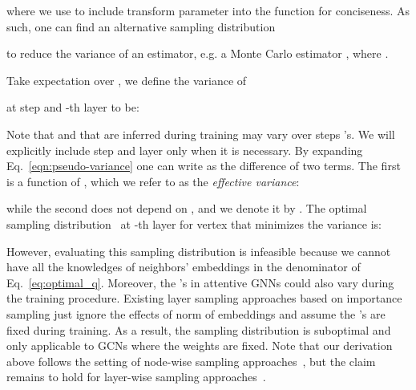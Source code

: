 \documentclass{article}
\begin{document}
where we use  to include transform parameter  into
the function  for conciseness.
As such, one can find an alternative sampling distribution 
 
to reduce the variance of an estimator,
e.g. a Monte Carlo estimator ,
where . 

Take expectation over , we define the variance of 

at step  and -th layer to be:

Note that  and  that are
inferred during training may
vary over steps 's. 
We will explicitly include step  and layer  only 
when it is necessary.
By expanding Eq.~\eqref{eqn:pseudo-variance} one can write 
 as the difference of two terms. The first is a 
function of , which we refer to as the 
\textit{effective variance}:

while the second does not depend on , and we denote it by 
.
The optimal sampling distribution~\cite{chen2018fastgcn,huang2018adaptive} at -th layer for vertex  that minimizes the variance is:

However, evaluating this sampling distribution is
infeasible because we cannot have all the knowledges
of neighbors' embeddings in the denominator of Eq.~\eqref{eq:optimal_q}. Moreover, the 's
in attentive GNNs could also vary during the training
procedure. Existing layer sampling approaches based
on importance sampling just ignore the effects of
norm of embeddings and assume the 's are fixed
during training. As a result, the sampling distribution is 
suboptimal and only applicable to GCNs where the weights
are fixed. Note that our derivation above follows the setting
of node-wise sampling approaches~\cite{hamilton2017inductive}, 
but the claim remains to hold for layer-wise 
sampling approaches~\cite{chen2018fastgcn,huang2018adaptive,zou2019layer}.

\begin{comment}
``Layer sampling'' approaches~\cite{chen2018fastgcn,huang2018adaptive} aim to sample neighbors
in a top-down manner, however, it is intractable 
to compute the above optimal sampling distribution 
because it requires evaluating the whole neighbors that are not known a priori,
and the neighbors' embedding  
or even weight  in attentive GNNs vary constantly
during the training procedure. FastGCN~\cite{chen2018fastgcn} calculates their
sampling distribution by simply ignoring the norm of neighbors'
embeddings, and AS-GCN~\cite{huang2018adaptive} approximates the neighbors' embeddings
via a linear mapping to the oracle.
\end{comment}
\end{document}
